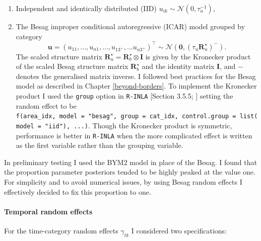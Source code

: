 \documentclass[a4paper, nobind]{templates/ociamthesis}
\providecommand{\tightlist}{%
  \setlength{\itemsep}{0pt}\setlength{\parskip}{0pt}}
\begin{document}
\begin{enumerate}
\def\labelenumi{\arabic{enumi}.}
\tightlist
\item
  Independent and identically distributed (IID) \(u_{ik} \sim \mathcal{N}(0, \tau_u^{-1})\),
\item
  The Besag improper conditional autoregressive (ICAR) model \autocite{besag1991bayesian} grouped by category
  \[
  \mathbf{u} = (u_{11}, \ldots, u_{n1}, \ldots, u_{1{3^{+}}}, \ldots u_{n3^{+}})^\top \sim \mathcal{N}(\mathbf{0}, (\tau_u \mathbf{R}^\star_u)^{-}).
  \]
  The scaled structure matrix \(\mathbf{R}^\star_u = \mathbf{R}^\star_b \otimes \mathbf{I}\) is given by the Kronecker product of the scaled Besag structure matrix \(\mathbf{R}^\star_b\) and the identity matrix \(\mathbf{I}\), and \({-}\) denotes the generalised matrix inverse.
  I followed best practices for the Besag model as described in Chapter \ref{beyond-borders}.
  To implement the Kronecker product I used the \texttt{group} option in \texttt{R-INLA} {[}Section 3.5.5; \textcite{gomez2020bayesian}{]} setting the random effect to be \texttt{f(area\_idx,\ model\ =\ "besag",\ group\ =\ cat\_idx,\ control.group\ =\ list(model\ =\ "iid"),\ ...)}.
  Though the Kronecker product is symmetric, performance is better in \texttt{R-INLA} when the more complicated effect is written as the first variable rather than the grouping variable.
\end{enumerate}

In preliminary testing I used the BYM2 model \autocite{simpson2017penalising} in place of the Besag.
I found that the proportion parameter posteriors tended to be highly peaked at the value one.
For simplicity and to avoid numerical issues, by using Besag random effects I effectively decided to fix this proportion to one.

\hypertarget{temporal-re}{%
\paragraph{Temporal random effects}\label{temporal-re}}

For the time-category random effects \(\gamma_{tk}\) I considered two specifications:
\end{document}
